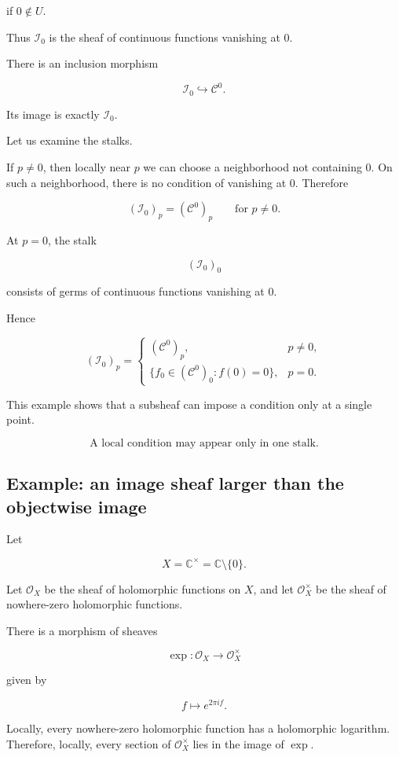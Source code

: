 \documentclass[12pt,a4paper]{article}
\theoremstyle{notespace}
\newcommand{\C}{\mathcal C}
\newcommand{\Ocal}{\mathcal O}
\newcommand{\I}{\mathcal I}
\begin{document}
	if $0\notin U$.
	
	Thus $\I_0$ is the sheaf of continuous functions vanishing at $0$.
	
	There is an inclusion morphism
	
	\[
	\I_0\hookrightarrow \C^0.
	\]
	
	Its image is exactly $\I_0$.
	
	Let us examine the stalks.
	
	If $p\neq 0$, then locally near $p$ we can choose a neighborhood not containing
	$0$. On such a neighborhood, there is no condition of vanishing at $0$.
	Therefore
	
	\[
	(\I_0)_p=(\C^0)_p
	\qquad
	\text{for } p\neq 0.
	\]
	
	At $p=0$, the stalk
	
	\[
	(\I_0)_0
	\]
	
	consists of germs of continuous functions vanishing at $0$.
	
	Hence
	
	\[
	(\I_0)_p
	=
	\begin{cases}
		(\C^0)_p, & p\neq 0,\\[4pt]
		\{f_0\in(\C^0)_0 : f(0)=0\}, & p=0.
	\end{cases}
	\]
	
	This example shows that a subsheaf can impose a condition only at a single
	point.
	
	\[
	\boxed{
		\text{A local condition may appear only in one stalk.}
	}
	\]
	
	\subsection{Example: an image sheaf larger than the objectwise image}
	
	Let
	
	\[
	X=\mathbb C^\times
	=
	\mathbb C\setminus\{0\}.
	\]
	
	Let $\Ocal_X$ be the sheaf of holomorphic functions on $X$, and let
	$\Ocal_X^\times$ be the sheaf of nowhere-zero holomorphic functions.
	
	There is a morphism of sheaves
	
	\[
	\exp:\Ocal_X\to \Ocal_X^\times
	\]
	
	given by
	
	\[
	f\longmapsto e^{2\pi i f}.
	\]
	
	Locally, every nowhere-zero holomorphic function has a holomorphic logarithm.
	Therefore, locally, every section of $\Ocal_X^\times$ lies in the image of
	$\exp$.
	
\end{document}
